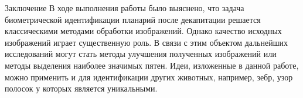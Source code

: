 \documentclass{article}
\begin{document}
\begin{section}{Заключение}
    В ходе выполнения работы было выяснено, что задача биометрической идентификации планарий после декапитации решается классическими методами обработки изображений. Однако качество исходных изображений играет существенную роль. В связи с этим объектом дальнейших исследований могут стать методы улучшения полученных изображений или методы выделения наиболее значимых пятен. 
Идеи, изложенные в данной работе, можно применить и для идентификации других животных, например, зебр, узор полосок у которых является уникальными.
\end{section}



\end{document}
